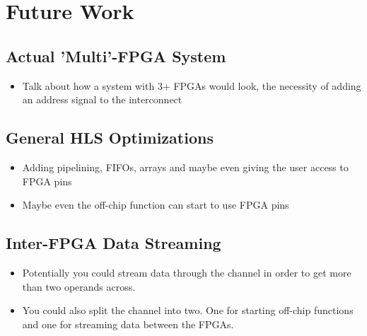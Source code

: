 \chapter{Future Work}

\section{Actual 'Multi'-FPGA System}

\begin{itemize}
    \item Talk about how a system with 3+ FPGAs would look, the necessity of adding an address signal to the interconnect
\end{itemize}

\section{General HLS Optimizations}

\begin{itemize}
    \item Adding pipelining, FIFOs, arrays and maybe even giving the user access to FPGA pins
    \item Maybe even the off-chip function can start to use FPGA pins
\end{itemize}

\section{Inter-FPGA Data Streaming}

\begin{itemize}
    \item Potentially you could stream data through the channel in order to get more than two operands across.
    \item You could also split the channel into two. One for starting off-chip functions and one for streaming data between the FPGAs.
\end{itemize}
